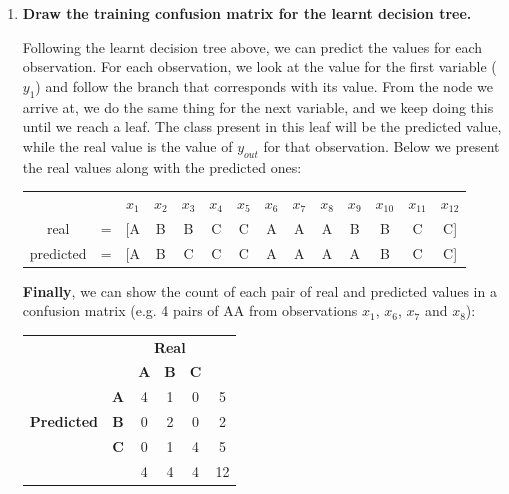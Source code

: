 \documentclass[12pt]{article}
\begin{document}
\begin{enumerate}[leftmargin=\labelsep]
    \item \textbf{Draw the training confusion matrix for the learnt decision tree.}

    \vskip 0.3cm
    Following the learnt decision tree above, we can predict the values for each observation.
    For each observation, we look at the value for the first variable ($y_1$) and follow the branch that corresponds with its value.
    From the node we arrive at, we do the same thing for the next variable, and we keep doing this until we reach a leaf.
    The class present in this leaf will be the predicted value, while the real value is the value of $y_{out}$ for that observation.
    Below we present the real values along with the predicted ones:

    \begin{center}
        \begin{tabular}{cccccccccccccc}
            \multicolumn{2}{c}{}           & $x_1$ & $x_2$ & $x_3$ & $x_4$ & $x_5$ & $x_6$ & $x_7$ & $x_8$ & $x_9$ & $x_{10}$ & $x_{11}$ & $x_{12}$ \\
            \multirow{1}{*}{real}      & = & [A   & B   & B   & C   & C   & A   & A   & A   & B   & B   & C   & C]                                  \\
            \multirow{1}{*}{predicted} & = & [A   & B   & C   & C   & C   & A   & A   & A   & A   & B   & C   & C]
        \end{tabular}
    \end{center}

    \textbf{Finally}, we can show the count of each pair of real and predicted values in a confusion matrix (e.g. 4 pairs of AA from observations $x_1$, $x_6$, $x_7$ and $x_8$):

    \vspace{0.5em}
    \begin{center}
        \begin{tabular}{|c|c|c|c|c|c|}
            \cline{3-5}
            \multicolumn{2}{c}{}                & \multicolumn{3}{|c|}{\textbf{Real}} & \multicolumn{1}{c}{}  \\
            \cline{3-5}
            \multicolumn{2}{c|}{}               & \textbf{A} & \textbf{B} & \textbf{C} & \multicolumn{1}{c}{} \\
            \hline
                                                & \textbf{A} & 4 & 1 & 0 & 5                                  \\
            \cline{2-6}
            \multirow{1}{*}{\textbf{Predicted}} & \textbf{B} & 0 & 2 & 0 & 2                                  \\
            \cline{2-6}
                                                & \textbf{C} & 0 & 1 & 4 & 5                                  \\
            \hline
            \multicolumn{2}{c|}{}               & 4 & 4 & 4 & 12                                              \\
            \cline{3-6}
        \end{tabular}
    \end{center}


\end{enumerate}
\end{document}
